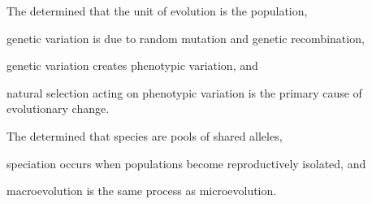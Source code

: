 \documentclass[t,handout]{beamer}  %
\begin{document}
\begin{frame}[t]{The  determined that}
\hangpara the unit of evolution is the population,

\hangpara genetic variation is due to random mutation and genetic recombination,

\hangpara genetic variation creates phenotypic variation, and

\hangpara natural selection acting on phenotypic variation is the primary cause of evolutionary change.

\end{frame}

\begin{frame}[t]{The  determined that}
\hangpara species are pools of shared alleles, 

\hangpara speciation occurs when populations become reproductively isolated, and

\hangpara macroevolution is the same process as microevolution.


\end{frame}
\end{document}
